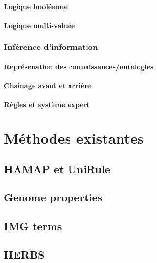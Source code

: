 \begin{refsection}
\paragraph{Logique booléenne}
\paragraph{Logique multi-valuée}
\subsubsection{Inférence d’information}
\paragraph{Représenation des connaissances/ontologies}
\paragraph{Chainage avant et arrière} %
\paragraph{Règles et système expert}

\section{Méthodes existantes}
\subsection{HAMAP et UniRule}
\subsection{Genome properties}
\subsection{IMG terms}
\subsection{HERBS} \citep[voir][]{lima2009hamap}
\printbibliography[segment=\therefsegment,heading=subbibliography]
\end{refsection}